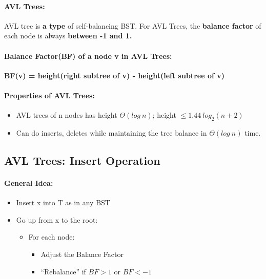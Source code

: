 \documentclass{article}
\begin{document}
\paragraph{AVL Trees: } AVL tree is \textbf{a type} of self-balancing BST. For AVL Trees, the \textbf{balance factor} of each node is always \textbf{between -1 and 1.}
\paragraph{Balance Factor(BF) of a node v in AVL Trees: }\begin{center}{\textbf{BF(v) = height(right subtree of v) - height(left subtree of v)}}\\
\end{center}
\paragraph{Properties of AVL Trees: }
\begin{itemize}
\item AVL trees of n nodes has height $\Theta(log\ n)$; height $\leq 1.44 \ log_2(n+2)$
\item Can do inserts, deletes while maintaining the tree balance in $\Theta(log\ n)$ time.
\end{itemize}
\subsection{AVL Trees: Insert Operation}
\paragraph{General Idea: }
\begin{itemize}
\item Insert x into T as in any BST
\item Go up from x to the root:
\begin{itemize}
\item For each node:
\begin{itemize}
\item 
Adjust the Balance Factor
\item
``Rebalance'' if $BF > 1 \text{ or }BF < -1$
\end{itemize}
\end{itemize}
\end{itemize}
\end{document}
